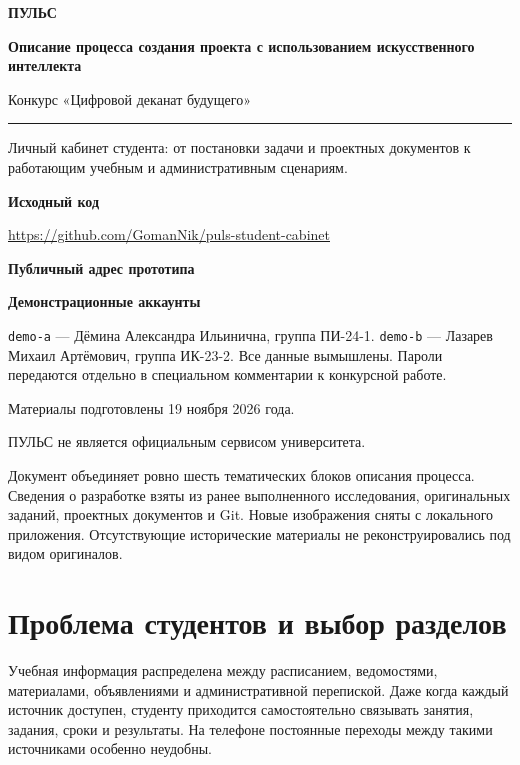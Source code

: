 \documentclass[11pt,a4paper]{article}
\newcommand{\source}[1]{{\small\color{muted}#1\par}}
\begin{document}
\begin{titlepage}
\vspace*{15mm}
{\fontsize{48}{52}\selectfont\bfseries\color{plum}ПУЛЬС\par}
\vspace{9mm}
{\LARGE\bfseries Описание процесса создания проекта с использованием искусственного интеллекта\par}
\vspace{8mm}
{\large Конкурс «Цифровой деканат будущего»\par}
\vspace{13mm}
\rule{\linewidth}{0.5pt}
\vspace{4mm}
Личный кабинет студента: от постановки задачи и проектных документов к работающим учебным и административным сценариям.

\vspace{5mm}
\textbf{Исходный код}\par
\url{https://github.com/GomanNik/puls-student-cabinet}

\textbf{Публичный адрес прототипа}\par
{}

\textbf{Демонстрационные аккаунты}\par
\texttt{demo-a} — Дёмина Александра Ильинична, группа ПИ-24-1.\newline
\texttt{demo-b} — Лазарев Михаил Артёмович, группа ИК-23-2.\newline
Все данные вымышлены. Пароли передаются отдельно в специальном комментарии к конкурсной работе.
\vfill
{\color{muted}Материалы подготовлены 19 ноября 2026 года.\par
ПУЛЬС не является официальным сервисом университета.}
\end{titlepage}
\tableofcontents
\vspace{8mm}
\source{Документ объединяет ровно шесть тематических блоков описания процесса. Сведения о разработке взяты из ранее выполненного исследования, оригинальных заданий, проектных документов и Git. Новые изображения сняты с локального приложения. Отсутствующие исторические материалы не реконструировались под видом оригиналов.}
\clearpage
\section{Проблема студентов и выбор разделов}
Учебная информация распределена между расписанием, ведомостями, материалами, объявлениями и административной перепиской. Даже когда каждый источник доступен, студенту приходится самостоятельно связывать занятия, задания, сроки и результаты. На телефоне постоянные переходы между такими источниками особенно неудобны.
\end{document}
